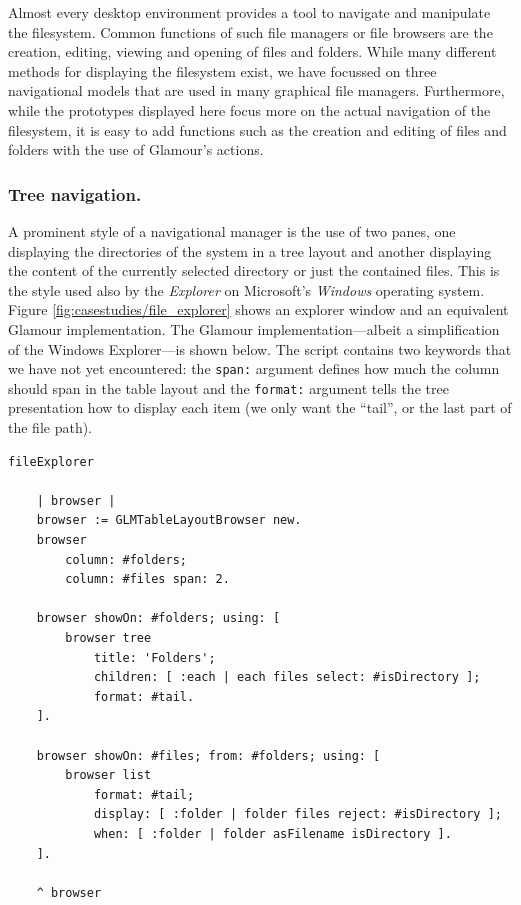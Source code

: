 \documentclass[a4paper,10pt,twoside]{book}
\begin{document}
Almost every desktop environment provides a tool to navigate and
manipulate the filesystem. Common functions of such file managers or
file browsers are the creation, editing, viewing and opening of files
and folders. While many different methods for displaying the
filesystem exist, we have focussed on three navigational models that
are used in many graphical file managers. Furthermore, while the
prototypes displayed here focus more on the actual navigation of the
filesystem, it is easy to add functions such as the creation and
editing of files and folders with the use of Glamour's actions.


\subsubsection{Tree navigation.} A prominent style of a navigational
manager is the use of two panes, one displaying the directories of the
system in a tree layout and another displaying the content of the
currently selected directory or just the contained files. This is the
style used also by the \emph{Explorer} on Microsoft's \emph{Windows}
operating system. Figure \ref{fig:casestudies/file_explorer} shows an
explorer window and an equivalent Glamour implementation. The Glamour
implementation---albeit a simplification of the Windows Explorer---is
shown below. The script contains two keywords that we have not yet
encountered: the \texttt{span:} argument defines how much the column
should span in the table layout and the \texttt{format:} argument
tells the tree presentation how to display each item (we only want the
``tail'', or the last part of the file path).

\begin{lstlisting}
fileExplorer

	| browser |
	browser := GLMTableLayoutBrowser new.
	browser
		column: #folders;
		column: #files span: 2. 

	browser showOn: #folders; using: [
		browser tree 
			title: 'Folders'; 
			children: [ :each | each files select: #isDirectory ];
			format: #tail.
	].

	browser showOn: #files; from: #folders; using: [
		browser list 
			format: #tail; 
			display: [ :folder | folder files reject: #isDirectory ];
			when: [ :folder | folder asFilename isDirectory ].
	].

	^ browser
\end{lstlisting}
\end{document}
